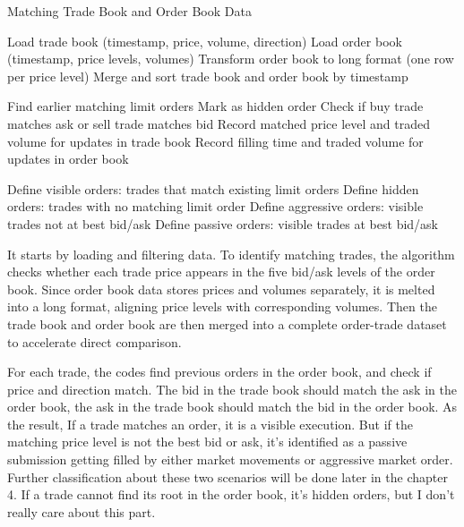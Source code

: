 \begin{algorithm}
    \caption{Matching Trade Book and Order Book Data}
    \label{alg:trade_order_matching}
    \begin{algorithmic}[1]
        \State Load trade book (timestamp, price, volume, direction)
        \State Load order book (timestamp, price levels, volumes)
        \State Transform order book to long format (one row per price level)
        \State Merge and sort trade book and order book by timestamp
    
            \State Find earlier matching limit orders
                \State Mark as hidden order
            \Else
                \State Check if buy trade matches ask or sell trade matches bid
                \State Record matched price level and traded volume for updates in trade book
                \State Record filling time and traded volume for updates in order book
            \EndIf
        \EndFor
    
        \State Define visible orders: trades that match existing limit orders
        \State Define hidden orders: trades with no matching limit order
        \State Define aggressive orders: visible trades not at best bid/ask
        \State Define passive orders: visible trades at best bid/ask
    
    \end{algorithmic}
\end{algorithm}

It starts by loading and filtering data. To identify matching trades, the algorithm checks whether each trade price appears in the five bid/ask levels of the order book. Since order book data stores prices and volumes separately, it is melted into a long format, aligning price levels with corresponding volumes. Then the trade book and order book are then merged into a complete order-trade dataset to accelerate direct comparison.

For each trade, the codes find previous orders in the order book, and check if price and direction match. The bid in the trade book should match the ask in the order book, the ask in the trade book should match the bid in the order book. As the result, If a trade matches an order, it is a visible execution. But if the matching price level is not the best bid or ask, it's identified as a passive submission getting filled by either market movements or aggressive market order. Further classification about these two scenarios will be done later in the chapter 4. If a trade cannot find its root in the order book, it's hidden orders, but I don't really care about this part.

